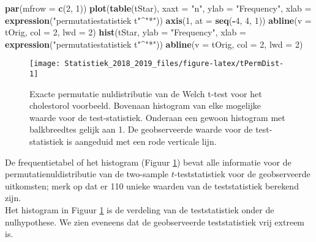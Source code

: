 \documentclass[12pt,dutch,coursenotes]{book}
\newenvironment{Shaded}{\begin{snugshade}}{\end{snugshade}}
\newcommand{\KeywordTok}[1]{\textcolor[rgb]{0.13,0.29,0.53}{\textbf{#1}}}
\newcommand{\DataTypeTok}[1]{\textcolor[rgb]{0.13,0.29,0.53}{#1}}
\newcommand{\DecValTok}[1]{\textcolor[rgb]{0.00,0.00,0.81}{#1}}
\newcommand{\StringTok}[1]{\textcolor[rgb]{0.31,0.60,0.02}{#1}}
\newcommand{\OperatorTok}[1]{\textcolor[rgb]{0.81,0.36,0.00}{\textbf{#1}}}
\newcommand{\NormalTok}[1]{#1}
\theoremstyle{definition}
\theoremstyle{definition}
\theoremstyle{definition}
\theoremstyle{remark}
\begin{document}
\begin{Shaded}
\begin{Highlighting}[]
\KeywordTok{par}\NormalTok{(}\DataTypeTok{mfrow =} \KeywordTok{c}\NormalTok{(}\DecValTok{2}\NormalTok{, }\DecValTok{1}\NormalTok{))}
\KeywordTok{plot}\NormalTok{(}\KeywordTok{table}\NormalTok{(tStar), }\DataTypeTok{xaxt =} \StringTok{"n"}\NormalTok{, }\DataTypeTok{ylab =} \StringTok{"Frequency"}\NormalTok{, }
    \DataTypeTok{xlab =} \KeywordTok{expression}\NormalTok{(}\StringTok{"permutatiestatistiek t"}\OperatorTok{^}\StringTok{"*"}\NormalTok{))}
\KeywordTok{axis}\NormalTok{(}\DecValTok{1}\NormalTok{, }\DataTypeTok{at =} \KeywordTok{seq}\NormalTok{(}\OperatorTok{-}\DecValTok{4}\NormalTok{, }\DecValTok{4}\NormalTok{, }\DecValTok{1}\NormalTok{))}
\KeywordTok{abline}\NormalTok{(}\DataTypeTok{v =}\NormalTok{ tOrig, }\DataTypeTok{col =} \DecValTok{2}\NormalTok{, }\DataTypeTok{lwd =} \DecValTok{2}\NormalTok{)}
\KeywordTok{hist}\NormalTok{(tStar, }\DataTypeTok{ylab =} \StringTok{"Frequency"}\NormalTok{, }\DataTypeTok{xlab =} \KeywordTok{expression}\NormalTok{(}\StringTok{"permutatiestatistiek t"}\OperatorTok{^}\StringTok{"*"}\NormalTok{))}
\KeywordTok{abline}\NormalTok{(}\DataTypeTok{v =}\NormalTok{ tOrig, }\DataTypeTok{col =} \DecValTok{2}\NormalTok{, }\DataTypeTok{lwd =} \DecValTok{2}\NormalTok{)}
\end{Highlighting}
\end{Shaded}

\begin{figure}

{\centering \texttt{[image: Statistiek\_2018\_2019\_files/figure-latex/tPermDist-1]} 

}

\caption{Exacte permutatie nuldistributie van de Welch t-test voor het cholestorol voorbeeld. Bovenaan histogram van elke mogelijke waarde voor de test-statistiek. Onderaan een gewoon histogram met balkbreedtes gelijk aan 1. De geobserveerde waarde voor de test-statistiek is aangeduid met een rode verticale lijn.}\label{fig:tPermDist}
\end{figure}

De frequentietabel of het histogram (Figuur \ref{fig:tPermDist}) bevat
alle informatie voor de permutatienuldistributie van de two-sample
\(t\)-teststatistiek voor de geobserveerde uitkomsten; merk op dat er
110 unieke waarden van de teststatistiek berekend zijn.\\
Het histogram in Figuur \ref{fig:tPermDist} is de verdeling van de
teststatistiek onder de nulhypothese. We zien eveneens dat de
geobserveerde teststatistiek vrij extreem is.
\end{document}
